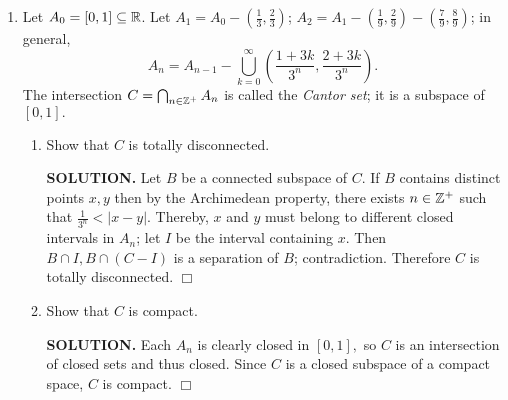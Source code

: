 \documentclass{article}
\begin{document}
\begin{enumerate}
    {\bf SOLUTION.} We will show that any nonempty open set $U$ in $X$ must contain a point that is not in $\bigcup A_n.$ Since $A_1$ has an empty interior, $U$ is not contained in $A_1.$ Given $x \in U-A_1,$ the closed set $A_1 \cup (X-U)$ does not contain $x.$ By compactness of $X,$ $A_1 \cup (X-U)$ is compact. Thus there exist disjoint open sets $V_1, W$ containing $a, A_1 \cup (X-U),$ respectively. It follows that
    $$x \in V_1 \subseteq \overline{V_1} \subseteq X - (A_1 \cup (X-U)) = U - A_1.$$
    Similarly, $V_1$ is a nonempty open set in $X$ not contained in $A_2,$ so there exists a nonempty open set $V_2$ such that $\overline{V_2} \subseteq V_1 - A_2.$ Continuing this process, we obtain a sequence
    $$\overline{V_1} \supseteq \overline{V_2} \supseteq \cdots$$
    of nonempty nested closed sets of $X.$ By compactness of $X$, there exists $x \in \bigcap_{i=1}^\infty V_i \subseteq \overline{V_1} \subseteq U$, so that $x \notin A_i$ for all $i \in \ints^+.$

    We have shown that any nonempty open set $U$ contains a point that is not in $\bigcup A_n.$ Therefore, $\bigcup A_n$ has an empty interior. $\Box$

    \item Let $A_0 = [0, 1] \subseteq \mathbb{R}$. Let $A_1 = A_0 - (\tfrac13, \tfrac23)$; $A_2 = A_1 - (\tfrac19, \tfrac29) - (\tfrac79, \tfrac89)$; in general,
    $$A_n = A_{n-1} - \bigcup_{k=0}^\infty \left( \frac{1+3k}{3^n}, \frac{2+3k}{3^n} \right).$$
    The intersection $C = \bigcap_{n \in \mathbb{Z}^+}A_n$ is called the {\it Cantor set}; it is a subspace of $[0, 1].$
    \begin{enumerate}
        \item Show that $C$ is totally disconnected.

        {\bf SOLUTION.} Let $B$ be a connected subspace of $C.$ If $B$ contains distinct points $x, y$ then by the Archimedean property, there exists $n \in \mathbb{Z}^+$ such that $\frac{1}{3^n} < |x-y|.$ Thereby, $x$ and $y$ must belong to different closed intervals in $A_n$; let $I$ be the interval containing $x.$ Then $B \cap I, B \cap (C-I)$ is a separation of $B$; contradiction. Therefore $C$ is totally disconnected. $\Box$
        
        \item Show that $C$ is compact.

        {\bf SOLUTION.} Each $A_n$ is clearly closed in $[0, 1],$ so $C$ is an intersection of closed sets and thus closed. Since $C$ is a closed subspace of a compact space, $C$ is compact. $\Box$
        

\end{enumerate}
\end{enumerate}
\end{document}
